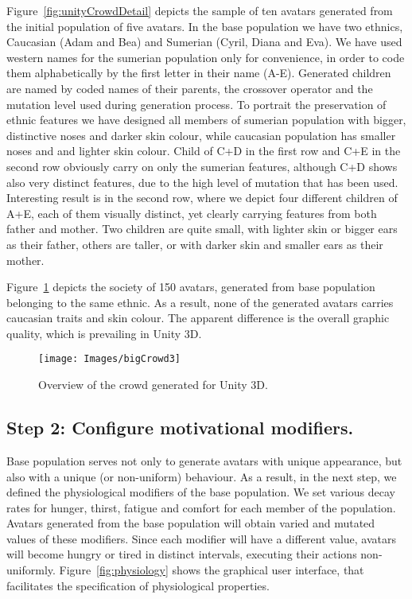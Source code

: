 Figure~\ref{fig:unityCrowdDetail} depicts the sample of ten avatars generated from the initial population of five avatars. In the base population we have two ethnics, Caucasian (Adam and Bea) and Sumerian (Cyril, Diana and Eva). We have used western names for the sumerian population only for convenience, in order to code them alphabetically by the first letter in their name (A-E). Generated children are named by coded names of their parents, the crossover operator and the mutation level used during generation process. To portrait the preservation of ethnic features we have designed all members of sumerian population with bigger, distinctive noses and darker skin colour, while caucasian population has smaller noses and and lighter skin colour. Child of C+D in the first row and C+E in the second row obviously carry on only the sumerian features, although C+D shows also very distinct features, due to the high level of mutation that has been used. Interesting result is in the second row, where we depict four different children of A+E, each of them visually distinct, yet clearly carrying features from both father and mother. Two children are quite small, with lighter skin or bigger ears as their father, others are taller, or with darker skin and smaller ears as their mother.

Figure~\ref{fig:unityCrowdOverview} depicts the society of 150 avatars, generated from base population belonging to the same ethnic. As a result, none of the generated avatars carries caucasian traits and skin colour. The apparent difference is the overall graphic quality, which is prevailing in Unity 3D.


\begin{figure}[!ht]
    \texttt{[image: Images/bigCrowd3]}
    \caption{Overview of the crowd generated for Unity 3D.}
    \label{fig:unityCrowdOverview}
\end{figure}%

\subsection{Step 2: Configure motivational modifiers.}

Base population serves not only to generate avatars with unique appearance, but also with a unique (or non-uniform) behaviour. As a result, in the next step, we defined the physiological modifiers of the base population. We set various decay rates for hunger, thirst, fatigue and comfort for each member of the population. Avatars generated from the base population will obtain varied and mutated values of these modifiers. Since each modifier will have a different value, avatars will become hungry or tired in distinct intervals, executing their actions non-uniformly. Figure~\ref{fig:physiology} shows the graphical user interface, that facilitates the specification of physiological properties.  



